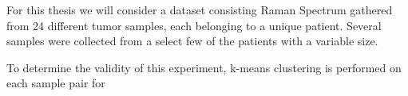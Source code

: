 For this thesis we will consider a dataset consisting Raman Spectrum gathered from 24 different tumor samples, each belonging to a unique patient. Several samples were collected from a select few of the patients with a variable size.

To determine the validity of this experiment, k-means clustering is performed on each sample pair for 